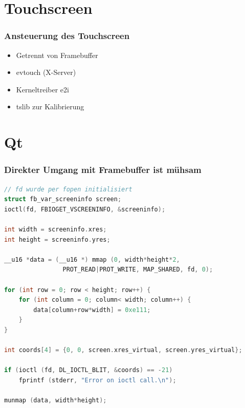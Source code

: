\documentclass{beamer}
\begin{document}
  \section{Touchscreen}
	
	\begin{frame}
		\frametitle{Ansteuerung des Touchscreen}
		\begin{itemize}
			\item Getrennt von Framebuffer
			\item evtouch (X-Server)
			\item Kerneltreiber e2i
			\item tslib zur Kalibrierung
		\end{itemize}
	\end{frame}	
	
	\section{Qt}
	
	\begin{frame}
  \frametitle{Direkter Umgang mit Framebuffer ist mühsam}
		\begin{lstlisting}[language=C, basicstyle=\scriptsize]
// fd wurde per fopen initialisiert
struct fb_var_screeninfo screen;
ioctl(fd, FBIOGET_VSCREENINFO, &screeninfo);

int width = screeninfo.xres;
int height = screeninfo.yres;

__u16 *data = (__u16 *) mmap (0, width*height*2, 
                PROT_READ|PROT_WRITE, MAP_SHARED, fd, 0);

for (int row = 0; row < height; row++) {
    for (int column = 0; column< width; column++) {
        data[column+row*width] = 0xe111;
    }
}

int coords[4] = {0, 0, screen.xres_virtual, screen.yres_virtual};

if (ioctl (fd, DL_IOCTL_BLIT, &coords) == -21) 
    fprintf (stderr, "Error on ioctl call.\n");

munmap (data, width*height);
		\end{lstlisting}
	\end{frame}	
	
\end{document}
